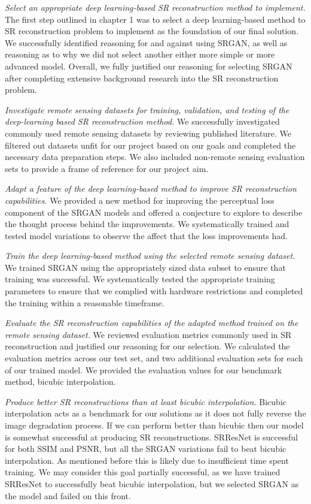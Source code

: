 \textit{Select an appropriate deep learning-based SR reconstruction method to implement.} The first step outlined in chapter 1 was to select a deep learning-based method to SR reconstruction problem to implement as the foundation of our final solution. We successfully identified reasoning for and against using SRGAN, as well as reasoning as to why we did not select another either more simple or more advanced model. Overall, we fully justified our reasoning for selecting SRGAN after completing extensive background research into the SR reconstruction problem.

\textit{Investigate remote sensing datasets for training, validation, and testing of the deep-learning based SR reconstruction method.} We successfully investigated commonly used remote sensing datasets by reviewing published literature. We filtered out datasets unfit for our project based on our goals and completed the necessary data preparation steps. We also included non-remote sensing evaluation sets to provide a frame of reference for our project aim. 

\textit{Adapt a feature of the deep learning-based method to improve SR reconstruction capabilities.} We provided a new method for improving the perceptual loss component of the SRGAN models and offered a conjecture to explore to describe the thought process behind the improvements. We systematically trained and tested model variations to observe the affect that the loss improvements had.

\textit{Train the deep learning-based method using the selected remote sensing dataset.} We trained SRGAN using the appropriately sized data subset to ensure that training was successful. We systematically tested the appropriate training parameters to ensure that we complied with hardware restrictions and completed the training within a reasonable timeframe.

\textit{Evaluate the SR reconstruction capabilities of the adapted method trained on the remote sensing dataset.} We reviewed evaluation metrics commonly used in SR reconstruction and justified our reasoning for our selection. We calculated the evaluation metrics across our test set, and two additional evaluation sets for each of our trained model. We provided the evaluation values for our benchmark method, bicubic interpolation.

\textit{Produce better SR reconstructions than at least bicubic interpolation.} Bicubic interpolation acts as a benchmark for our solutions as it does not fully reverse the image degradation process. If we can perform better than bicubic then our model is somewhat successful at producing SR reconstructions. SRResNet is successful for both SSIM and PSNR, but all the SRGAN variations fail to beat bicubic interpolation. As mentioned before this is likely due to insufficient time spent training. We may consider this goal partially successful, as we have trained SRResNet to successfully beat bicubic interpolation, but we selected SRGAN as the model and failed on this front.


